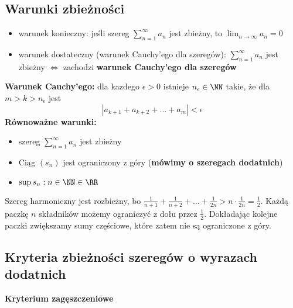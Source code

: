 \subsection{Warunki zbieżności}
\begin{itemize}
    \item warunek konieczny: jeśli szereg $\sum_{n=1}^{\infty}a_n$ jest zbieżny, to $\lim_{n\to\infty}a_n=0$
    \item warunek dostateczny (warunek Cauchy'ego dla szeregów): $\sum_{n=1}^{\infty}a_n$ jest zbieżny $\Longleftrightarrow$ zachodzi \textbf{warunek Cauchy'ego dla szeregów}
\end{itemize}
\textbf{Warunek Cauchy'ego:} dla kazdego $\epsilon > 0$ istnieje $n_{\epsilon}\in \NN$ takie, że dla $m > k > n_{\epsilon}$ jest 
$$
|a_{k+1}+a_{k+2}+\dots+a_m| < \epsilon
$$
\textbf{Równoważne warunki:}
\begin{itemize}
    \item szereg $\sum_{n=1}^{\infty}a_n$ jest zbieżny
    \item Ciąg $(s_n)$ jest ograniczony z góry (\textbf{mówimy o szeregach dodatnich})
    \item $\sup{s_n : n\in\NN}\in \RR$
\end{itemize}
\begin{example}
    Szereg harmoniczny jest rozbieżny, bo $\frac{1}{n+1} + \frac{1}{n+2}+\dots+\frac{1}{2n}> n \cdot \frac{1}{2n} =\frac{1}{2}$. Każdą paczkę $n$ składników możemy ograniczyć z dołu przez $\frac{1}{2}$. Dokładając kolejne paczki zwiększamy sumy częściowe, które zatem nie są ograniczone z góry.
\end{example}
\subsection{Kryteria zbieżności szeregów o wyrazach dodatnich}
\textbf{Kryterium zagęszczeniowe}

